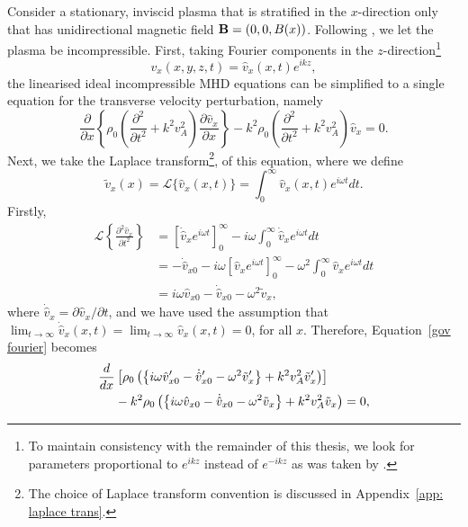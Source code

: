 \documentclass[12pt]{../style-files/ociamthesis}
\begin{document}
Consider a stationary, inviscid plasma that is stratified in the $x$-direction only that has unidirectional magnetic field $\mathbf{B} = (0, 0, B(x))$. Following \cite{rae_etal81}, we let the plasma be incompressible. First, taking Fourier components in the $z$-direction\footnote{To maintain consistency with the remainder of this thesis, we look for parameters proportional to $e^{ikz}$ instead of $e^{-ikz}$ as was taken by \cite{rae_etal81}.}
\begin{equation}
v_x(x,y,z,t) = \hat{v}_x(x,t)e^{ikz},
\end{equation}
the linearised ideal incompressible MHD equations can be simplified to a single equation for the transverse velocity perturbation, namely \citep{pri14}
\begin{equation}
\frac{\partial}{\partial x}\left\{\rho_0\left(\frac{\partial^2}{\partial t^2} + k^2v_A^2\right) \frac{\partial\hat{v}_x}{\partial x}\right\} - k^2\rho_0\left(\frac{\partial^2}{\partial t^2} + k^2v_A^2\right)\hat{v}_x = 0.
\label{gov fourier}
\end{equation}
Next, we take the Laplace transform\footnote{The choice of Laplace transform convention is discussed in Appendix~\ref{app: laplace trans}.}, of this equation, where we define
\begin{equation}
\tilde{v}_x(x) = \mathcal{L}\{\hat{v}_x(x,t)\} = \int_0^\infty \hat{v}_x(x,t)e^{i\omega t} dt.
\end{equation}
Firstly,
\begin{align}
\mathcal{L}\left\{\frac{\partial^2 \hat{v}_x}{\partial t^2}\right\} & = \left[\dot{\hat{v}}_x e^{i\omega t}\right]_0^\infty - i\omega \int_0^\infty \dot{\hat{v}}_x e^{i\omega t} dt \\
& = -\dot{\hat{v}}_{x0} - i\omega\left[\hat{v}_x e^{i\omega t}\right]_0^\infty -\omega^2 \int_0^\infty \hat{v}_x e^{i\omega t} dt \\
& = i\omega \hat{v}_{x0} - \dot{\hat{v}}_{x0} - \omega^2 \tilde{v}_x,
\end{align}
where $\dot{\hat{v}}_x = \partial\hat{v}_x/\partial t$, and we have used the assumption that $\lim_{t \to \infty} \dot{\hat{v}}_{x}(x,t) = \lim_{t \to \infty} \hat{v}_{x}(x,t) = 0$, for all $x$. Therefore, Equation~\eqref{gov fourier} becomes
\begin{align}
\frac{d}{dx} &\left[\rho_0\left(\left\{i\omega \hat{v}_{x0}' - \dot{\hat{v}}_{x0}' - \omega^2\tilde{v}_x'\right\} + k^2v_A^2 \tilde{v}_x'\right)\right] \notag \\
&- k^2\rho_0 \left(\left\{i\omega \hat{v}_{x0} - \dot{\hat{v}}_{x0} - \omega^2\tilde{v}_x\right\} + k^2v_A^2 \tilde{v}_x\right) = 0, \notag
\end{align}
\end{document}
